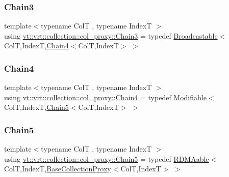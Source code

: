 \subsubsection{\texorpdfstring{Chain3}{Chain3}}
{\footnotesize\ttfamily template$<$typename ColT , typename IndexT $>$ \\
using \hyperlink{namespacevt_1_1vrt_1_1collection_1_1col__proxy_aa83ea97afbf21f975d02b933af0ee42c}{vt\+::vrt\+::collection\+::col\+\_\+proxy\+::\+Chain3} = typedef \hyperlink{structvt_1_1vrt_1_1collection_1_1_broadcastable}{Broadcastable}$<$ColT,IndexT,\hyperlink{namespacevt_1_1vrt_1_1collection_1_1col__proxy_a0a277f3614b856c9e780e5446efd84f3}{Chain4}$<$ColT,IndexT$>$ $>$}

\mbox{\label{namespacevt_1_1vrt_1_1collection_1_1col__proxy_a0a277f3614b856c9e780e5446efd84f3}} 
\subsubsection{\texorpdfstring{Chain4}{Chain4}}
{\footnotesize\ttfamily template$<$typename ColT , typename IndexT $>$ \\
using \hyperlink{namespacevt_1_1vrt_1_1collection_1_1col__proxy_a0a277f3614b856c9e780e5446efd84f3}{vt\+::vrt\+::collection\+::col\+\_\+proxy\+::\+Chain4} = typedef \hyperlink{structvt_1_1vrt_1_1collection_1_1_modifiable}{Modifiable}$<$ColT,IndexT,\hyperlink{namespacevt_1_1vrt_1_1collection_1_1col__proxy_a96685f5884d57269c5c7dfe14dcc361b}{Chain5}$<$ColT,IndexT$>$ $>$}

\mbox{\label{namespacevt_1_1vrt_1_1collection_1_1col__proxy_a96685f5884d57269c5c7dfe14dcc361b}} 
\subsubsection{\texorpdfstring{Chain5}{Chain5}}
{\footnotesize\ttfamily template$<$typename ColT , typename IndexT $>$ \\
using \hyperlink{namespacevt_1_1vrt_1_1collection_1_1col__proxy_a96685f5884d57269c5c7dfe14dcc361b}{vt\+::vrt\+::collection\+::col\+\_\+proxy\+::\+Chain5} = typedef \hyperlink{structvt_1_1vrt_1_1collection_1_1_r_d_m_aable}{R\+D\+M\+Aable}$<$ColT,IndexT,\hyperlink{structvt_1_1vrt_1_1collection_1_1_base_collection_proxy}{Base\+Collection\+Proxy}$<$ColT,IndexT$>$ $>$}

